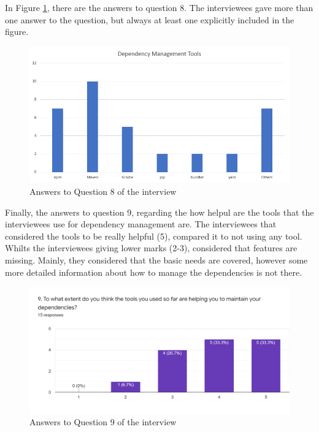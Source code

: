 In Figure \ref{fig:interview-8}, there are the answers to question 8. The interviewees gave more than one answer to the question, but always at least one explicitly included in the figure.

\begin{figure}[ht!]
\begin{center}
\includegraphics[width=\textwidth]{figures/interview/Question8.png}
\caption{Answers to Question 8 of the interview}
\label{fig:interview-8}
\end{center}
\end{figure}

Finally, the answers to question 9, regarding the how helpul are the tools that the interviewees use for dependency management are. The interviewees that considered the tools to be really helpful (5), compared it to not using any tool. Whilts the interviewees giving lower marks (2-3), considered that features are missing. Mainly, they considered that the basic needs are covered, however some more detailed information about how to manage the dependencies is not there.

\begin{figure}[ht!]
\begin{center}
\includegraphics[width=\textwidth]{figures/interview/Question9.png}
\caption{Answers to Question 9 of the interview}
\label{fig:interview-9}
\end{center}
\end{figure}


